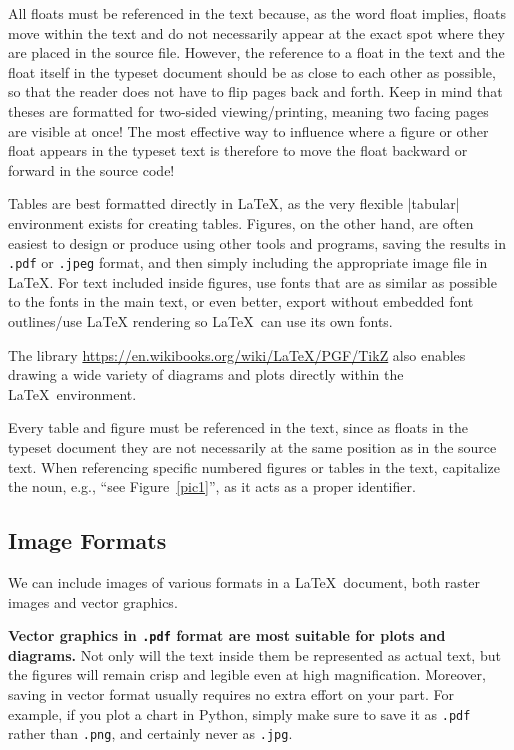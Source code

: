 \documentclass[9pt]{style/friteza}
\begin{document}
All floats must be referenced in the text because, as the word float implies, floats move within the text and do not necessarily appear at the exact spot where they are placed in the source file.
However, the reference to a float in the text and the float itself in the typeset document should be as close to each other as possible, so that the reader does not have to flip pages back and forth.
Keep in mind that theses are formatted for two-sided viewing/printing, meaning two facing pages are visible at once!
The most effective way to influence where a figure or other float appears in the typeset text is therefore to move the float backward or forward in the source code!

Tables are best formatted directly in \LaTeX, as the very flexible \ltx|tabular| environment exists for creating tables.
Figures, on the other hand, are often easiest to design or produce using other tools and programs, saving the results in {\tt .pdf} or {\tt .jpeg} format, and then simply including the appropriate image file in \LaTeX. For text included inside figures, use fonts that are as similar as possible to the fonts in the main text, or even better, export without embedded font outlines/use LaTeX rendering so \LaTeX\ can use its own fonts.

The library \url{https://en.wikibooks.org/wiki/LaTeX/PGF/TikZ}
also enables drawing a wide variety of diagrams and plots directly within the \LaTeX\ environment.

Every table and figure must be referenced in the text, since as floats in the typeset document they are not necessarily at the same position as in the source text.
When referencing specific numbered figures or tables in the text, capitalize the noun, e.g., \enquote{see Figure~\ref{pic1}}, as it acts as a proper identifier.

\subsection{Image Formats}
\label{subsec:formatislik}

We can include images of various formats in a \LaTeX\ document, both
raster images and vector graphics.

\textbf{Vector graphics in {\tt .pdf} format are most suitable for plots and diagrams.} Not only will the text inside them be represented as actual text, but the figures will remain crisp and legible even at high magnification. Moreover, saving in vector format usually requires no extra effort on your part. For example, if you plot a chart in Python, simply make sure to save it as {\tt .pdf} rather than {\tt .png}, and certainly never as {\tt .jpg}.
\end{document}
